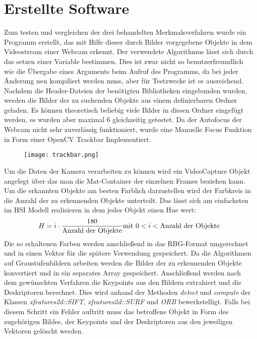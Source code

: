 \section{Erstellte Software}
Zum testen und vergleichen der drei behandelten Merkmalsverfahren wurde ein Programm erstellt, das mit Hilfe dieser durch Bilder vorgegebene Objekte in dem Videostream einer Webcam erkennt.
Der verwendete Algorithmus lässt sich durch das setzen einer Variable bestimmen. Dies ist zwar nicht so benutzerfreundlich wie die Übergabe eines Arguments beim Aufruf des Programms, da bei jeder Änderung neu kompiliert werden muss, aber für Testzwecke ist es ausreichend.
Nachdem die Header-Dateien der benötigten Bibliotheken eingebunden wurden, werden die Bilder der zu suchenden Objekte aus einem definierbaren Ordner geladen. Es können theoretisch beliebig viele Bilder in diesen Ordner eingefügt werden, es wurden aber maximal 6 gleichzeitig getestet.
Da der Autofocus der Webcam nicht sehr zuverlässig funktioniert, wurde eine Manuelle Focus Funktion in Form einer OpenCV Trackbar Implementiert. 
\begin{figure}[h]
\texttt{[image: trackbar.png]}
\centering
\end{figure}
Um die Daten der Kamera verarbeiten zu können wird ein VideoCapture Objekt angelegt über das man die Mat-Container der einzelnen Frames beziehen kann.
Um die erkannten Objekte am besten Farblich darzustellen wird der Farbkreis in die Anzahl der zu erkennenden Objekte unterteilt. Das lässt sich am einfachsten im HSI Modell realisieren in dem jedes Objekt einen Hue wert:
\begin{equation}
H = i \cdot \dfrac{180}{\text{Anzahl der Objekte}} \\
\text{mit } 0 < i < \text{Anzahl der Objekte}
\end{equation}
Die so erhaltenen Farben werden anschließend in das RBG-Format umgerechnet und in einen Vektor für die spätere Verwendung gespeichert.
Da die Algorithmen auf Graustufenbildern arbeiten werden die Bilder der zu erkennenden Objekte konvertiert und in ein separates Array gespeichert.
Anschließend werden nach dem gewünschten Verfahren die Keypoints aus den Bildern extrahiert und die Deskriptoren berechnet.
Dies wird anhand der Methoden \emph{detect} und \emph{compute} der Klassen \emph{xfeatures2d::SIFT}, \emph{xfeatures2d::SURF} und \emph{ORB} bewerkstelligt. 
Falls bei diesem Schritt ein Fehler auftritt muss das betroffene Objekt in Form des zugehörigen Bildes, der Keypoints und der Deskriptoren aus den jeweiligen Vektoren gelöscht werden.

